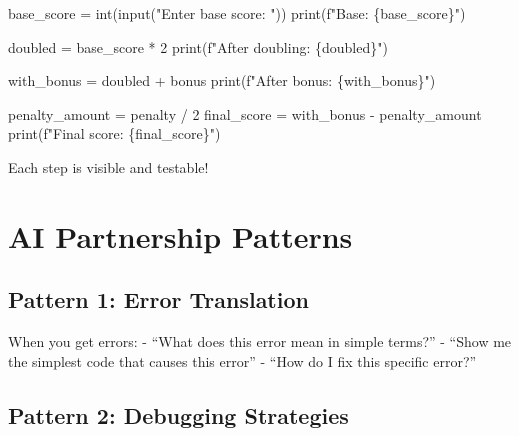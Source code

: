 \documentclass[
  letterpaper,
  DIV=11,
  numbers=noendperiod,
  oneside]{scrreprt}
\newenvironment{Shaded}{}{}
\newcommand{\BuiltInTok}[1]{\textcolor[rgb]{0.84,0.23,0.29}{#1}}
\newcommand{\DecValTok}[1]{\textcolor[rgb]{0.00,0.36,0.77}{#1}}
\newcommand{\NormalTok}[1]{\textcolor[rgb]{0.14,0.16,0.18}{#1}}
\newcommand{\OperatorTok}[1]{\textcolor[rgb]{0.14,0.16,0.18}{#1}}
\newcommand{\SpecialCharTok}[1]{\textcolor[rgb]{0.00,0.36,0.77}{#1}}
\newcommand{\SpecialStringTok}[1]{\textcolor[rgb]{0.01,0.18,0.38}{#1}}
\newcommand{\StringTok}[1]{\textcolor[rgb]{0.01,0.18,0.38}{#1}}
\begin{document}
\begin{Shaded}
\begin{Highlighting}[]
\NormalTok{base\_score }\OperatorTok{=} \BuiltInTok{int}\NormalTok{(}\BuiltInTok{input}\NormalTok{(}\StringTok{"Enter base score: "}\NormalTok{))}
\BuiltInTok{print}\NormalTok{(}\SpecialStringTok{f"Base: }\SpecialCharTok{\{}\NormalTok{base\_score}\SpecialCharTok{\}}\SpecialStringTok{"}\NormalTok{)}

\NormalTok{doubled }\OperatorTok{=}\NormalTok{ base\_score }\OperatorTok{*} \DecValTok{2}
\BuiltInTok{print}\NormalTok{(}\SpecialStringTok{f"After doubling: }\SpecialCharTok{\{}\NormalTok{doubled}\SpecialCharTok{\}}\SpecialStringTok{"}\NormalTok{)}

\NormalTok{with\_bonus }\OperatorTok{=}\NormalTok{ doubled }\OperatorTok{+}\NormalTok{ bonus}
\BuiltInTok{print}\NormalTok{(}\SpecialStringTok{f"After bonus: }\SpecialCharTok{\{}\NormalTok{with\_bonus}\SpecialCharTok{\}}\SpecialStringTok{"}\NormalTok{)}

\NormalTok{penalty\_amount }\OperatorTok{=}\NormalTok{ penalty }\OperatorTok{/} \DecValTok{2}
\NormalTok{final\_score }\OperatorTok{=}\NormalTok{ with\_bonus }\OperatorTok{{-}}\NormalTok{ penalty\_amount}
\BuiltInTok{print}\NormalTok{(}\SpecialStringTok{f"Final score: }\SpecialCharTok{\{}\NormalTok{final\_score}\SpecialCharTok{\}}\SpecialStringTok{"}\NormalTok{)}
\end{Highlighting}
\end{Shaded}

Each step is visible and testable!

\section{AI Partnership Patterns}\label{ai-partnership-patterns-8}

\subsection{Pattern 1: Error
Translation}\label{pattern-1-error-translation}

When you get errors: - ``What does this error mean in simple terms?'' -
``Show me the simplest code that causes this error'' - ``How do I fix
this specific error?''

\subsection{Pattern 2: Debugging
Strategies}\label{pattern-2-debugging-strategies}
\end{document}
